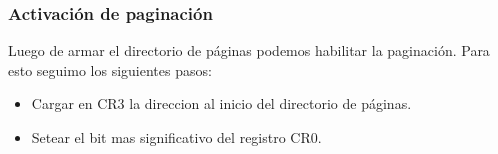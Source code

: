\subsubsection{Activaci\'on de paginaci\'on}

Luego de armar el directorio de p\'aginas podemos habilitar la paginaci\'on. Para esto seguimo los siguientes pasos:
\begin{itemize}
 \item Cargar en CR3 la direccion al inicio del directorio de p\'aginas.
 \item Setear el bit mas significativo del registro CR0.
\end{itemize}

